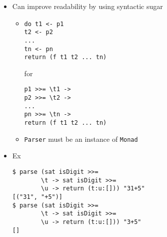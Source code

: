 \begin{itemize}
\begin{itemize}
\begin{itemize}
\begin{verbatim}
(>>=) :: Parser a -> (a -> Parser b) -> Parser b
p >>= g = Prs (\s -> [(u, s'') | (t, s') <- parser p s
                        (u, s'') <- parser (g t) s'])
\end{verbatim}
                        \item Can improve readability by using syntactic sugar
                            \begin{itemize}
                                \item
\begin{verbatim}
do t1 <- p1
t2 <- p2
...
tn <- pn
return (f t1 t2 ... tn)
\end{verbatim} for
\begin{verbatim}
p1 >>= \t1 ->
p2 >>= \t2 ->
...
pn >>= \tn ->
return (f t1 t2 ... tn)
\end{verbatim}
                                \item \verb+Parser+ must be an instance of \verb+Monad+
                            \end{itemize}
                        \item Ex
\begin{verbatim}
$ parse (sat isDigit >>=
        \t -> sat isDigit >>=
        \u -> return (t:u:[])) "31+5"
[("31", "+5")]
$ parse (sat isDigit >>=
        \t -> sat isDigit >>=
        \u -> return (t:u:[])) "3+5"
[]
\end{verbatim}
                    \end{itemize}
        \end{itemize}
\end{itemize}

